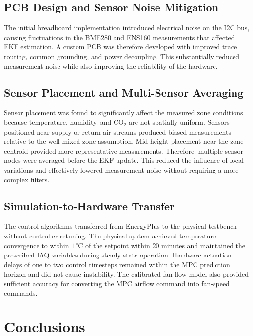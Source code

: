 \documentclass[12pt, a4paper]{article}
\begin{document}
\subsection{PCB Design and Sensor Noise Mitigation}

The initial breadboard implementation introduced electrical noise on the I2C bus, causing fluctuations in the BME280 and ENS160 measurements that affected EKF estimation. A custom PCB was therefore developed with improved trace routing, common grounding, and power decoupling. This substantially reduced measurement noise while also improving the reliability of the hardware.

\subsection{Sensor Placement and Multi-Sensor Averaging}

Sensor placement was found to significantly affect the measured zone conditions because temperature, humidity, and CO$_2$ are not spatially uniform. Sensors positioned near supply or return air streams produced biased measurements relative to the well-mixed zone assumption. Mid-height placement near the zone centroid provided more representative measurements. Therefore, multiple sensor nodes were averaged before the EKF update. This reduced the influence of local variations and effectively lowered measurement noise without requiring a more complex filters.

\subsection{Simulation-to-Hardware Transfer}

The control algorithms transferred from EnergyPlus to the physical testbench without controller retuning. The physical system achieved temperature convergence to within $1\,^\circ$C of the setpoint within 20 minutes and maintained the prescribed IAQ variables during steady-state operation. Hardware actuation delays of one to two control timesteps remained within the MPC prediction horizon and did not cause instability. The calibrated fan-flow model also provided sufficient accuracy for converting the MPC airflow command into fan-speed commands.


\newpage
\section{Conclusions}
\end{document}
